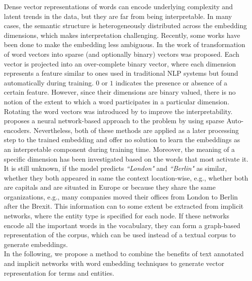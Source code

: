 Dense vector representations of words can encode underlying complexity and latent trends in the data, but they are far from being interpretable. In many cases, the semantic structure is heterogeneously distributed across the embedding dimensions, which makes interpretation challenging. 
Recently, some works have been done to make the embedding less ambiguous. In the work of  transformation of word vectors into sparse (and optionally binary) vectors was proposed. Each vector is projected into an over-complete binary vector, where each dimension represents a feature similar to ones used in traditional NLP systems but found automatically during training. $0$ or $1$ indicates the presence or absence of a certain feature. However, since their dimensions are binary valued, there is no notion of the extent to which a word participates in a particular dimension. Rotating the word vectors was introduced by  to improve the interpretability.   proposes a neural network-based approach to the problem by using sparse Auto-encoders. 
Nevertheless, both of these methods are applied as a later processing step to the trained embedding and offer no solution to learn the embeddings as an interpretable component during training time. Moreover, the meaning of a specific dimension has been investigated based on the words that most activate it. It is still unknown, if the model predicts \emph{``London"} and \emph{``Berlin"} as similar, whether they both appeared in same the context location-wise, e.g., whether both are capitals and are situated in Europe or because they share the same organizations, e.g., many companies moved their offices from London to Berlin after the Brexit. This information can to some extent be extracted from implicit networks, where the entity type is specified for each node. If these networks encode all the important words in the vocabulary, they can form a graph-based representation of the corpus, which can be used instead of a textual corpus to generate embeddings.\\
In the following, we propose a method to combine the benefits of text annotated and implicit networks with word embedding techniques to generate vector representation for terms and entities. 

